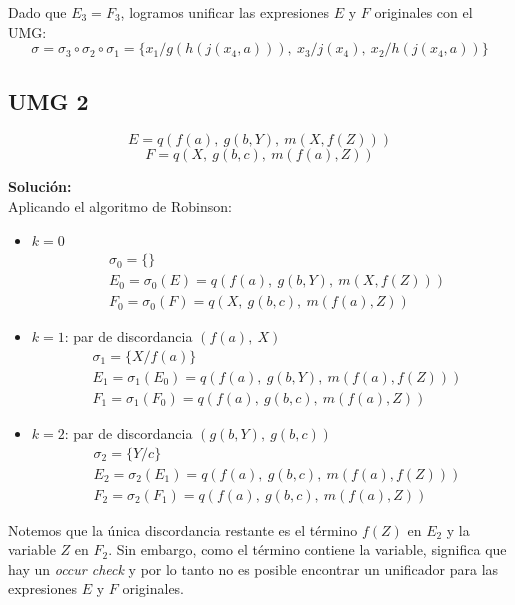 \documentclass{article}
\begin{document}
Dado que $E_{3} = F_{3}$, logramos unificar las expresiones $E$ y $F$ originales
con el UMG:
$$\sigma = \sigma_{3} \circ \sigma_{2} \circ \sigma_{1} = \{x_{1} / g(h(j(x_{4}, a))),\ x_{3}/j(x_{4}),\ x_{2}/h(j(x_{4}, a))\}$$


\subsection{UMG 2}
$$E = q(f(a),\ g(b, Y),\ m(X, f(Z)))$$
$$F = q(X,\ g(b, c),\ m(f(a), Z))$$

\textbf{Solución:}\\ Aplicando el algoritmo de Robinson:

\begin{itemize}
  \item $k = 0$
  \begin{align*}
    &\sigma_{0} = \{\}\\
    &E_{0} = \sigma_{0}(E) = q(f(a),\ g(b, Y),\ m(X, f(Z)))\\
    &F_{0} = \sigma_{0}(F) = q(X,\ g(b, c),\ m(f(a), Z))
  \end{align*}

  \item $k = 1$: par de discordancia $(f(a),\ X)$
  \begin{align*}
    &\sigma_{1} = \{X/f(a)\}\\
    &E_{1} = \sigma_{1}(E_{0}) = q(f(a),\ g(b, Y),\ m(f(a), f(Z)))\\
    &F_{1} = \sigma_{1}(F_{0}) = q(f(a),\ g(b, c),\ m(f(a), Z))
  \end{align*}

  \item $k = 2$: par de discordancia $(g(b, Y),\ g(b, c))$
  \begin{align*}
    &\sigma_{2} = \{Y/c\}\\
    &E_{2} = \sigma_{2}(E_{1}) = q(f(a),\ g(b, c),\ m(f(a), f(Z)))\\
    &F_{2} = \sigma_{2}(F_{1}) = q(f(a),\ g(b, c),\ m(f(a), Z))
  \end{align*}
\end{itemize}

Notemos que la única discordancia restante es el término $f(Z)$ en $E_{2}$ y la
variable $Z$ en $F_{2}$. Sin embargo, como el término contiene la variable, significa que hay un \textit{occur check} y por lo tanto no es posible encontrar un unificador para las expresiones $E$ y $F$ originales.


\newpage
\end{document}
